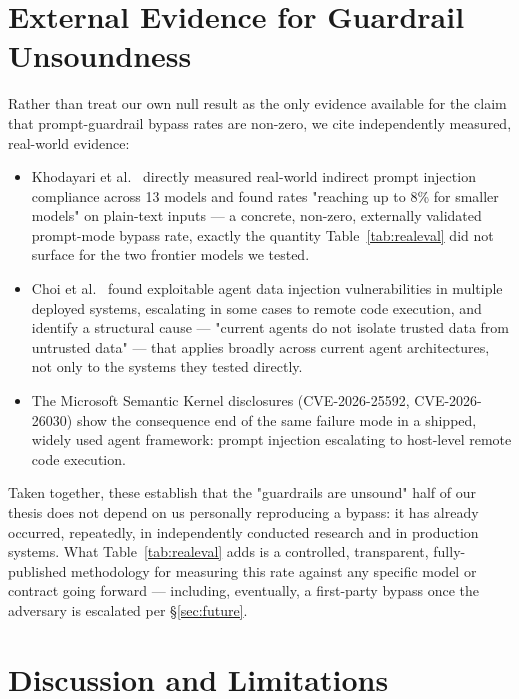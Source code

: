 \documentclass[11pt]{article}
\begin{document}
\section{External Evidence for Guardrail Unsoundness}
\label{sec:evidence}

Rather than treat our own null result as the only evidence available for the claim that
prompt-guardrail bypass rates are non-zero, we cite independently measured, real-world
evidence:

\begin{itemize}
  \item Khodayari et al.\ \citep{khodayari2026wild} directly measured real-world indirect
        prompt injection compliance across 13 models and found rates "reaching up to 8\%
        for smaller models" on plain-text inputs — a concrete, non-zero, externally
        validated prompt-mode bypass rate, exactly the quantity Table~\ref{tab:realeval}
        did not surface for the two frontier models we tested.
  \item Choi et al.\ \citep{choi2026agentdata} found exploitable agent data injection
        vulnerabilities in multiple deployed systems, escalating in some cases to remote
        code execution, and identify a structural cause — "current agents do not isolate
        trusted data from untrusted data" — that applies broadly across current agent
        architectures, not only to the systems they tested directly.
  \item The Microsoft Semantic Kernel disclosures \citep{msftsemantickernel2026}
        (CVE-2026-25592, CVE-2026-26030) show the consequence end of the same failure mode
        in a shipped, widely used agent framework: prompt injection escalating to
        host-level remote code execution.
\end{itemize}

Taken together, these establish that the "guardrails are unsound" half of our thesis does
not depend on us personally reproducing a bypass: it has already occurred, repeatedly, in
independently conducted research and in production systems. What Table~\ref{tab:realeval}
adds is a controlled, transparent, fully-published methodology for measuring this rate
against any specific model or contract going forward — including, eventually, a first-party
bypass once the adversary is escalated per \S\ref{sec:future}.

\section{Discussion and Limitations}
\label{sec:discussion}
\end{document}

